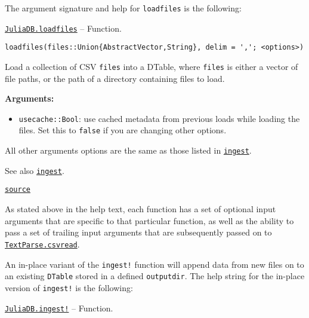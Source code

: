 \documentclass{memoir}
\begin{document}
The argument signature and help for \texttt{loadfiles} is the following:


\hypertarget{6091781697516830686}{} 
\hyperlink{6091781697516830686}{\texttt{JuliaDB.loadfiles}}  -- {Function.}

\begin{adjustwidth}{2em}{0pt}


\begin{lstlisting}
loadfiles(files::Union{AbstractVector,String}, delim = ','; <options>)
\end{lstlisting}

Load a collection of CSV \texttt{files} into a DTable, where \texttt{files} is either a vector of file paths, or the path of a directory containing files to load.

\textbf{Arguments:}

\begin{itemize}
\item \texttt{usecache::Bool}: use cached metadata from previous loads while loading the files. Set this to \texttt{false} if you are changing other options.

\end{itemize}
All other arguments options are the same as those listed in \href{tutorial.html\#JuliaDB.ingest}{\texttt{ingest}}.

See also \href{tutorial.html\#JuliaDB.ingest}{\texttt{ingest}}.



\href{https://github.com/JuliaComputing/JuliaDB.jl/tree/9e65f8c3b0e9c2e27c3334a093a5aefc6c7d1246/src/loadfiles.jl#L31-L44}{\texttt{source}}


\end{adjustwidth}

As stated above in the help text, each function has a set of optional input arguments that are specific to that particular function, as well as the ability to pass a set of trailing input arguments that are subsequently passed on to \href{https://juliacomputing.com/TextParse.jl/stable/index.html\#TextParse.csvread}{\texttt{TextParse.csvread}}.



An in-place variant of the \texttt{ingest!} function will append data from new files on to an existing \texttt{DTable} stored in a defined \texttt{outputdir}.  The help string for the in-place version of \texttt{ingest!} is the following:


\hypertarget{16413497473699948223}{} 
\hyperlink{16413497473699948223}{\texttt{JuliaDB.ingest!}}  -- {Function.}
\end{document}
